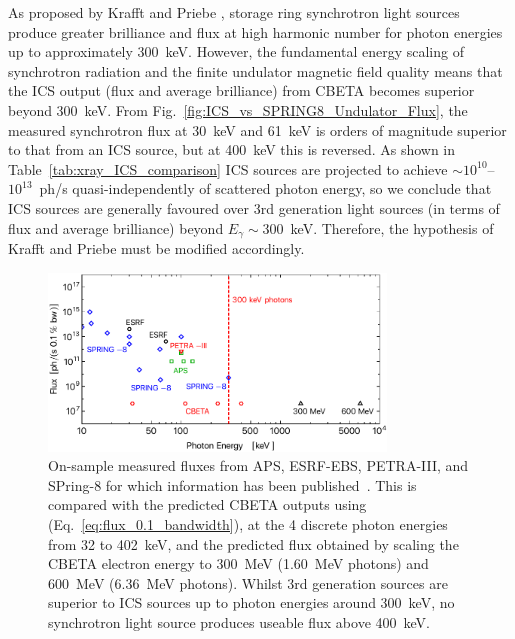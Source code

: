 \documentclass[../main.tex]{subfiles}
\begin{document}
As proposed by Krafft and Priebe \cite{krafft2010compton}, storage ring synchrotron light sources produce greater brilliance and flux at high harmonic number for photon energies up to approximately 300~\si{\kilo\electronvolt}. However, the fundamental energy scaling of synchrotron radiation and the finite undulator magnetic field quality means that the ICS output (flux and average brilliance) from CBETA becomes superior beyond 300~\si{\kilo\electronvolt}. From Fig.~\ref{fig:ICS_vs_SPRING8_Undulator_Flux}, the measured synchrotron flux at 30~\si{\kilo\electronvolt} and 61~\si{\kilo\electronvolt} \cite{spring8beamlines} is orders of magnitude superior to that from an ICS source, but at 400~\si{\kilo\electronvolt} this is reversed. As shown in Table~\ref{tab:xray_ICS_comparison} ICS sources are projected to achieve $\sim 10^{10}$--$10^{13}$~ph/\si{\second} quasi-independently of scattered photon energy, so we conclude that ICS sources are generally favoured over 3rd generation light sources (in terms of flux and average brilliance) beyond $E_{\gamma}\sim 300$~\si{\kilo\electronvolt}. Therefore, the hypothesis of Krafft and Priebe \cite{krafft2010compton} must be modified accordingly.  
\begin{figure}[!h]
\centering
\includegraphics[width=0.8\textwidth]{Figures/CBETA_Inverse_Compton_Source_Design/sourcefluxcomparison.pdf}
\caption{On-sample measured fluxes from APS, ESRF-EBS, PETRA-III, and SPring-8 for which information has been published~\cite{apsbeamlines,esrfbeamlines,petraiiibeamlines,spring8beamlines}. This is compared with the predicted CBETA outputs using (Eq.~\ref{eq:flux_0.1_bandwidth}), at the 4 discrete photon energies from 32 to 402~\si{\kilo\electronvolt}, and the predicted flux obtained by scaling the CBETA electron energy to 300~\si{\mega\electronvolt} (1.60~\si{\mega\electronvolt} photons) and 600~\si{\mega\electronvolt} (6.36~\si{\mega\electronvolt} photons). Whilst 3rd generation sources are superior to ICS sources up to photon energies around 300~\si{\kilo\electronvolt}, no synchrotron light source produces useable flux above 400~\si{\kilo\electronvolt}.}
\label{fig:ICS_Undulator_Comparison}
\end{figure}
\end{document}
